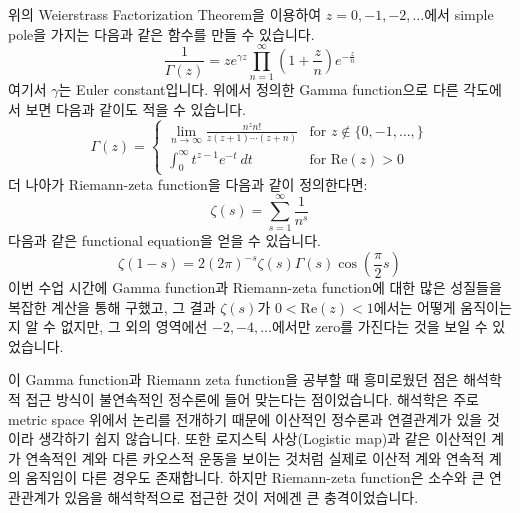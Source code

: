 \documentclass{article}
\begin{document}
위의 Weierstrass Factorization Theorem을 이용하여 $z=0, -1, -2, \ldots$에서 simple pole을 가지는 다음과 같은 함수를 만들 수 있습니다.
\begin{equation*}
\frac{1}{\Gamma(z)}=ze^{\gamma z}\prod\limits_{n=1}^\infty \left(1+\frac{z}{n}\right)e^{-\frac{z}{n}}
\end{equation*}
여기서 $\gamma$는 Euler constant입니다. 
위에서 정의한 Gamma function으로 다른 각도에서 보면 다음과 같이도 적을 수 있습니다.
\begin{equation*}
\Gamma(z)=\begin{cases}
\lim\limits_{n\rightarrow \infty}\frac{n^z n!}{z(z+1)\cdots (z+n)} & \text{for }z\notin \{0, -1, \ldots, \} \\
\int_0^\infty t^{z-1}e^{-t}~dt & \text{for Re}(z)>0
\end{cases}
\end{equation*}
더 나아가 Riemann-zeta function을 다음과 같이 정의한다면:
\begin{equation*}
\zeta(s)=\sum\limits_{s=1}^\infty \frac{1}{n^s}
\end{equation*}
다음과 같은 functional equation을 얻을 수 있습니다.
\begin{equation*}
\zeta(1-s)=2(2\pi)^{-s}\zeta(s)\Gamma(s)\cos\left(\frac{\pi}{2}s\right)
\end{equation*}
이번 수업 시간에 Gamma function과 Riemann-zeta function에 대한 많은 성질들을 복잡한 계산을 통해 구했고, 그 결과 $\zeta(s)$가 $0<\text{Re}(z)<1$에서는 어떻게 움직이는지 알 수 없지만, 그 외의 영역에선 $-2,-4, \ldots$에서만 zero를 가진다는 것을 보일 수 있었습니다.

이 Gamma function과 Riemann zeta function을 공부할 때 흥미로웠던 점은 해석학적 접근 방식이 불연속적인 정수론에 들어 맞는다는 점이었습니다. 해석학은 주로 metric space 위에서 논리를 전개하기 때문에 이산적인 정수론과 연결관계가 있을 것이라 생각하기 쉽지 않습니다. 또한 로지스틱 사상(Logistic map)과 같은 이산적인 계가 연속적인 계와 다른 카오스적 운동을 보이는 것처럼 실제로 이산적 계와 연속적 계의 움직임이 다른 경우도 존재합니다. 하지만 Riemann-zeta function은 소수와 큰 연관관계가 있음을 해석학적으로 접근한 것이 저에겐 큰 충격이었습니다.
\end{document}
